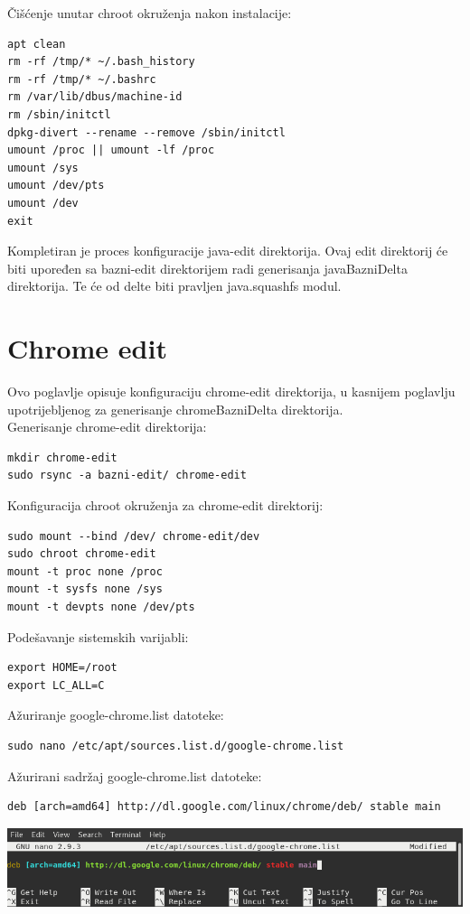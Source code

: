 \documentclass[12pt,vi]{mitthesis}
\begin{document}
\noindent
Čišćenje unutar chroot okruženja nakon instalacije:
\begin{lstlisting}[style=BashInputStyle]
apt clean
rm -rf /tmp/* ~/.bash_history
rm -rf /tmp/* ~/.bashrc
rm /var/lib/dbus/machine-id
rm /sbin/initctl
dpkg-divert --rename --remove /sbin/initctl
umount /proc || umount -lf /proc
umount /sys
umount /dev/pts
umount /dev
exit
\end{lstlisting}
Kompletiran je proces konfiguracije java-edit direktorija. Ovaj edit direktorij će biti upoređen sa bazni-edit direktorijem radi generisanja javaBazniDelta direktorija.
Te će od delte biti pravljen java.squashfs modul.
\section*{Chrome edit}
\indent
Ovo poglavlje opisuje konfiguraciju chrome-edit direktorija, u kasnijem poglavlju upotrijebljenog za generisanje chromeBazniDelta direktorija.\\ 
\noindent
Generisanje chrome-edit direktorija:
\begin{lstlisting}[style=BashInputStyle]
mkdir chrome-edit
sudo rsync -a bazni-edit/ chrome-edit
\end{lstlisting}
\noindent
Konfiguracija chroot okruženja za chrome-edit direktorij:
\begin{lstlisting}[style=BashInputStyle]
sudo mount --bind /dev/ chrome-edit/dev
sudo chroot chrome-edit
mount -t proc none /proc
mount -t sysfs none /sys
mount -t devpts none /dev/pts
\end{lstlisting}
\noindent
Podešavanje sistemskih varijabli:
\begin{lstlisting}[style=BashInputStyle]
export HOME=/root
export LC_ALL=C
\end{lstlisting}
\noindent
Ažuriranje google-chrome.list datoteke:
\begin{lstlisting}[style=BashInputStyle]
sudo nano /etc/apt/sources.list.d/google-chrome.list
\end{lstlisting}
\noindent
Ažurirani sadržaj google-chrome.list datoteke:
\begin{lstlisting}[style=BashInputStyle]
deb [arch=amd64] http://dl.google.com/linux/chrome/deb/ stable main
\end{lstlisting}
\includegraphics[width=\linewidth]{images/google-chrome-list.png} 
\end{document}
